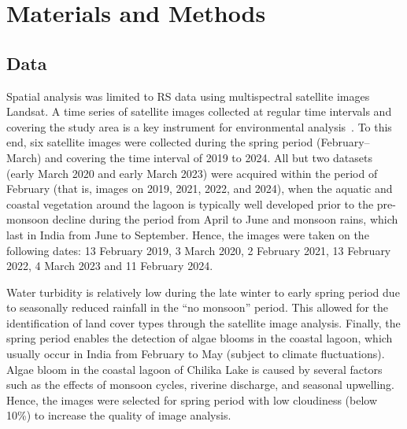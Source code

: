 \documentclass[jmse,article,accept,pdftex,oneauthor]{Definitions/mdpi}
\begin{document}
\section{Materials and Methods}

\subsection{Data}

Spatial analysis was limited to RS data using multispectral satellite images Landsat. A time series of satellite images collected at regular time intervals and covering the study area is a key instrument for environmental analysis~\cite{Lemenkova202324}. To this end, six satellite images were collected during the spring period (February--March) and covering the time interval of 2019 to 2024. All but two datasets (early March 2020 and early March 2023) were acquired within the period of February (that is, images on 2019, 2021, 2022, and 2024), when the aquatic and coastal vegetation around the lagoon is typically well developed prior to the pre-monsoon decline during the period from April to June and monsoon rains, which last in India from June to September. Hence, the images were taken on the following dates: 13 February 2019, 3 March 2020, 2 February 2021, 13 February 2022, 4 March 2023 and 11 February 2024. 

Water turbidity is relatively low during the late winter to early spring period due to seasonally reduced rainfall in the ``no monsoon'' period. This allowed for the identification of land cover types through the satellite image analysis. Finally, the spring period enables the detection of algae blooms in the coastal lagoon, which usually occur in India from February to May (subject to climate fluctuations). Algae bloom in the coastal lagoon of Chilika Lake is caused by several factors such as the effects of monsoon cycles, riverine discharge, and seasonal upwelling. Hence, the images were selected for spring period with low cloudiness (below 10\%) to increase the quality of image analysis. 
\end{document}
